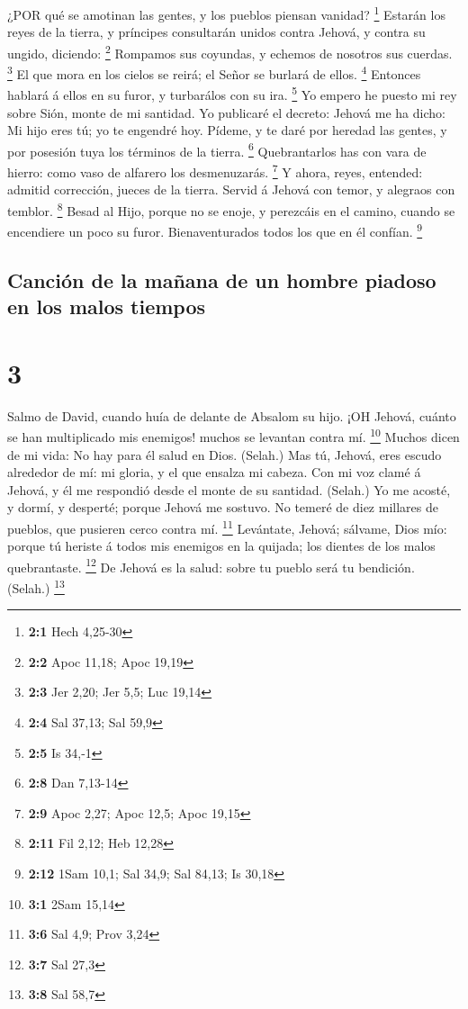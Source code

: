  ¿POR qué se amotinan las gentes, y los pueblos piensan
vanidad? \footnote{\textbf{2:1} Hech 4,25-30}  Estarán los
reyes de la tierra, y príncipes consultarán unidos contra Jehová, y
contra su ungido, diciendo: \footnote{\textbf{2:2} Apoc 11,18; Apoc
  19,19}  Rompamos sus coyundas, y echemos de nosotros sus
cuerdas. \footnote{\textbf{2:3} Jer 2,20; Jer 5,5; Luc 19,14}
 El que mora en los cielos se reirá; el Señor se burlará de
ellos. \footnote{\textbf{2:4} Sal 37,13; Sal 59,9}  Entonces
hablará á ellos en su furor, y turbarálos con su ira. \footnote{\textbf{2:5}
  Is 34,-1}  Yo empero he puesto mi rey sobre Sión, monte de
mi santidad.  Yo publicaré el decreto: Jehová me ha dicho:
Mi hijo eres tú; yo te engendré hoy.  Pídeme, y te daré por
heredad las gentes, y por posesión tuya los términos de la tierra.
\footnote{\textbf{2:8} Dan 7,13-14}  Quebrantarlos has con
vara de hierro: como vaso de alfarero los desmenuzarás. \footnote{\textbf{2:9}
  Apoc 2,27; Apoc 12,5; Apoc 19,15}  Y ahora, reyes,
entended: admitid corrección, jueces de la tierra.  Servid
á Jehová con temor, y alegraos con temblor. \footnote{\textbf{2:11} Fil
  2,12; Heb 12,28}  Besad al Hijo, porque no se enoje, y
perezcáis en el camino, cuando se encendiere un poco su furor.
Bienaventurados todos los que en él confían. \footnote{\textbf{2:12}
  1Sam 10,1; Sal 34,9; Sal 84,13; Is 30,18}

\hypertarget{canciuxf3n-de-la-mauxf1ana-de-un-hombre-piadoso-en-los-malos-tiempos}{%
\subsection{Canción de la mañana de un hombre piadoso en los malos
tiempos}\label{canciuxf3n-de-la-mauxf1ana-de-un-hombre-piadoso-en-los-malos-tiempos}}

\hypertarget{section-2}{%
\section{3}\label{section-2}}

 Salmo de David, cuando huía de delante de Absalom su hijo.
¡OH Jehová, cuánto se han multiplicado mis enemigos! muchos se levantan
contra mí. \footnote{\textbf{3:1} 2Sam 15,14}  Muchos dicen
de mi vida: No hay para él salud en Dios. (Selah.)  Mas tú,
Jehová, eres escudo alrededor de mí: mi gloria, y el que ensalza mi
cabeza.  Con mi voz clamé á Jehová, y él me respondió desde
el monte de su santidad. (Selah.)  Yo me acosté, y dormí, y
desperté; porque Jehová me sostuvo.  No temeré de diez
millares de pueblos, que pusieren cerco contra mí. \footnote{\textbf{3:6}
  Sal 4,9; Prov 3,24}  Levántate, Jehová; sálvame, Dios mío:
porque tú heriste á todos mis enemigos en la quijada; los dientes de los
malos quebrantaste. \footnote{\textbf{3:7} Sal 27,3}  De
Jehová es la salud: sobre tu pueblo será tu bendición. (Selah.)
\footnote{\textbf{3:8} Sal 58,7}

